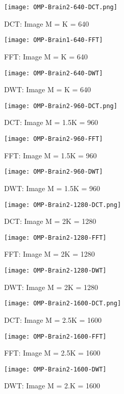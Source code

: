 \documentclass[titlepage,oneside, 12pt]{book}
\theoremstyle{break}
\begin{document}
\begin{figure}[!h]
\centering
{}
  \texttt{[image: OMP-Brain2-640-DCT.png]}
  \caption{DCT: Image M = K = 640}\label{fig:OMP-Brain2-640-DCT}
\endminipage
\hspace*{2em}
  \texttt{[image: OMP-Brain1-640-FFT]}
  \caption{FFT: Image M = K = 640}\label{fig:OMP-Brain2-640-FFT}
\endminipage
\hspace*{2em}
%
  \texttt{[image: OMP-Brain2-640-DWT]}
  \caption{DWT: Image M = K = 640}\label{fig:OMP-Brain2-640-DWT}
\endminipage
\hspace*{2em}
\end{figure}

\begin{figure}[!h]
\centering
{}
  \texttt{[image: OMP-Brain2-960-DCT.png]}
  \caption{DCT: Image M = 1.5K = 960}\label{fig:OMP-Brain2-960-DCT}
\endminipage
\hspace*{2em}
  \texttt{[image: OMP-Brain2-960-FFT]}
  \caption{FFT: Image M = 1.5K = 960}\label{fig:OMP-Brain2-960-FFT}
\endminipage
\hspace*{2em}
%
  \texttt{[image: OMP-Brain2-960-DWT]}
  \caption{DWT: Image M = 1.5K = 960}\label{fig:OMP-Brain2-960-DWT}
\endminipage
\hspace*{2em}
\end{figure}

\clearpage
\begin{figure}[!h]
\centering
{}
  \texttt{[image: OMP-Brain2-1280-DCT.png]}
  \caption{DCT: Image M = 2K = 1280}\label{fig:OMP-Brain2-1280-DCT}
\endminipage
\hspace*{2em}
  \texttt{[image: OMP-Brain2-1280-FFT]}
  \caption{FFT: Image M = 2K = 1280}\label{fig:OMP-Brain2-1280-FFT}
\endminipage
\hspace*{2em}
%
  \texttt{[image: OMP-Brain2-1280-DWT]}
  \caption{DWT: Image M = 2K = 1280}\label{fig:OMP-Brain2-1280-DWT}
\endminipage
\hspace*{2em}
\end{figure}

\begin{figure}[!h]
\centering
{}
  \texttt{[image: OMP-Brain2-1600-DCT.png]}
  \caption{DCT: Image M = 2.5K = 1600}\label{fig:OMP-Brain2-1600-DCT}
\endminipage
\hspace*{2em}
  \texttt{[image: OMP-Brain2-1600-FFT]}
  \caption{FFT: Image M = 2.5K = 1600}\label{fig:OMP-Brain2-1600-FFT}
\endminipage
\hspace*{2em}
%
  \texttt{[image: OMP-Brain2-1600-DWT]}
  \caption{DWT: Image M = 2.K = 1600}\label{fig:OMP-Brain2-1600-DWT}
\endminipage
\hspace*{2em}
\end{figure}
\end{document}
